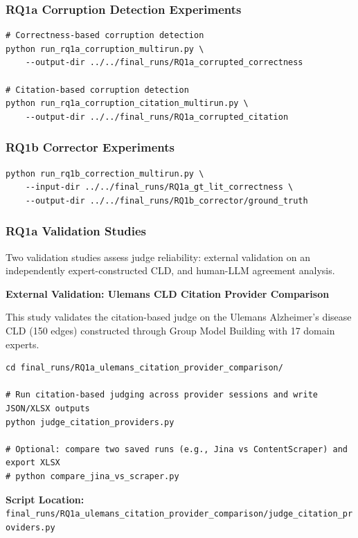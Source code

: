 \subsubsection{RQ1a Corruption Detection Experiments}

\begin{verbatim}
# Correctness-based corruption detection
python run_rq1a_corruption_multirun.py \
    --output-dir ../../final_runs/RQ1a_corrupted_correctness

# Citation-based corruption detection
python run_rq1a_corruption_citation_multirun.py \
    --output-dir ../../final_runs/RQ1a_corrupted_citation
\end{verbatim}

\subsubsection{RQ1b Corrector Experiments}

\begin{verbatim}
python run_rq1b_correction_multirun.py \
    --input-dir ../../final_runs/RQ1a_gt_lit_correctness \
    --output-dir ../../final_runs/RQ1b_corrector/ground_truth
\end{verbatim}

\subsubsection{RQ1a Validation Studies}
\label{sec:rq1a_validation}

Two validation studies assess judge reliability: external validation on an independently expert-constructed CLD, and human-LLM agreement analysis.

\textbf{External Validation: Ulemans CLD Citation Provider Comparison}

This study validates the citation-based judge on the Ulemans Alzheimer's disease CLD (150 edges) constructed through Group Model Building with 17 domain experts.

\begin{verbatim}
cd final_runs/RQ1a_ulemans_citation_provider_comparison/

# Run citation-based judging across provider sessions and write JSON/XLSX outputs
python judge_citation_providers.py

# Optional: compare two saved runs (e.g., Jina vs ContentScraper) and export XLSX
# python compare_jina_vs_scraper.py
\end{verbatim}

\textbf{Script Location:} \texttt{final\_runs/RQ1a\_ulemans\_citation\_provider\_comparison/judge\_citation\_providers.py}


